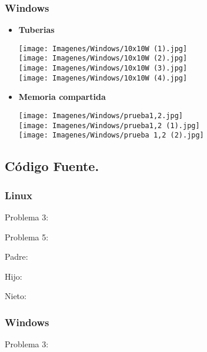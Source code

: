 \documentclass[12pt]{article}
\begin{document}
    \subsubsection{Windows}
        \begin{itemize}
            \item \textbf{Tuberias}
            \begin{center}
                \texttt{[image: Imagenes/Windows/10x10W (1).jpg]}\\
                 \texttt{[image: Imagenes/Windows/10x10W (2).jpg]}\\
                  \texttt{[image: Imagenes/Windows/10x10W (3).jpg]}\\
                   \texttt{[image: Imagenes/Windows/10x10W (4).jpg]}\\
                  
            \end{center}
            \item \textbf{Memoria compartida}\\
            \begin{center}
                \texttt{[image: Imagenes/Windows/prueba1,2.jpg]}\\
               \texttt{[image: Imagenes/Windows/prueba1,2 (1).jpg]}\\
                \texttt{[image: Imagenes/Windows/prueba 1,2 (2).jpg]}
                
            \end{center}
        \end{itemize}
\subsection{Código Fuente.}
   \subsubsection{Linux}
   Problema 3:
   
   
    
    Problema 5:
    
    Padre:
   
   Hijo:
   
   Nieto:
   
        
   \subsubsection{Windows}
   Problema 3:
   
\end{document}
